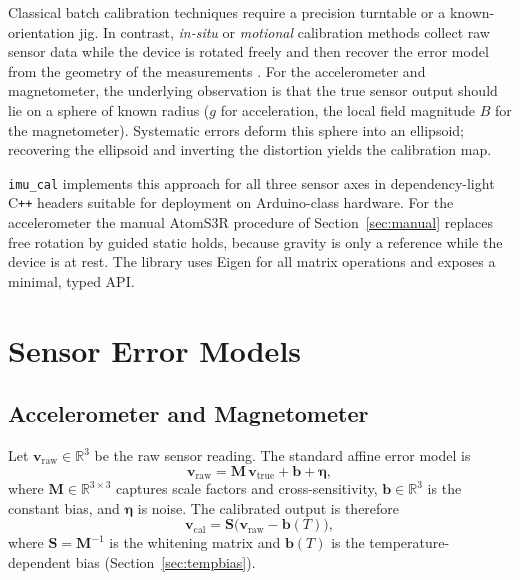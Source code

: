 \documentclass[conference]{IEEEtran}
\begin{document}
    Classical batch calibration techniques require a precision turntable
    or a known-orientation jig.
    In contrast, \emph{in-situ} or \emph{motional} calibration methods
    collect raw sensor data while the device is rotated freely and
    then recover the error model from the geometry of the measurements
    \cite{Vasconcelos2011}.
    For the accelerometer and magnetometer, the underlying observation
    is that the true sensor output should lie on a sphere of known
    radius ($g$ for acceleration, the local field magnitude $B$ for
    the magnetometer).
    Systematic errors deform this sphere into an ellipsoid; recovering
    the ellipsoid and inverting the distortion yields the calibration map.

    \texttt{imu\_cal} implements this approach for all three sensor axes
    in dependency-light C\texttt{++} headers suitable
    for deployment on Arduino-class hardware.
    For the accelerometer the manual AtomS3R procedure of
    Section~\ref{sec:manual} replaces free rotation by guided static holds,
    because gravity is only a reference while the device is at rest.
    The library uses Eigen \cite{Eigen} for all matrix operations
    and exposes a minimal, typed API.

    \section{Sensor Error Models}

    \subsection{Accelerometer and Magnetometer}

    Let $\mathbf{v}_\text{raw} \in \mathbb{R}^3$ be the raw sensor reading.
    The standard affine error model is
    \begin{equation}
        \mathbf{v}_\text{raw} = \mathbf{M}\,\mathbf{v}_\text{true} + \mathbf{b}
        + \boldsymbol{\eta},
    \end{equation}
    where $\mathbf{M} \in \mathbb{R}^{3\times 3}$ captures scale factors and
    cross-sensitivity, $\mathbf{b} \in \mathbb{R}^3$ is the constant bias, and
    $\boldsymbol{\eta}$ is noise.
    The calibrated output is therefore
    \begin{equation}
        \mathbf{v}_\text{cal} = \mathbf{S}\bigl(\mathbf{v}_\text{raw} -
        \mathbf{b}(T)\bigr),
        \label{eq:cal_model}
    \end{equation}
    where $\mathbf{S} = \mathbf{M}^{-1}$ is the whitening matrix and
    $\mathbf{b}(T)$ is the temperature-dependent bias (Section~\ref{sec:tempbias}).
\end{document}
